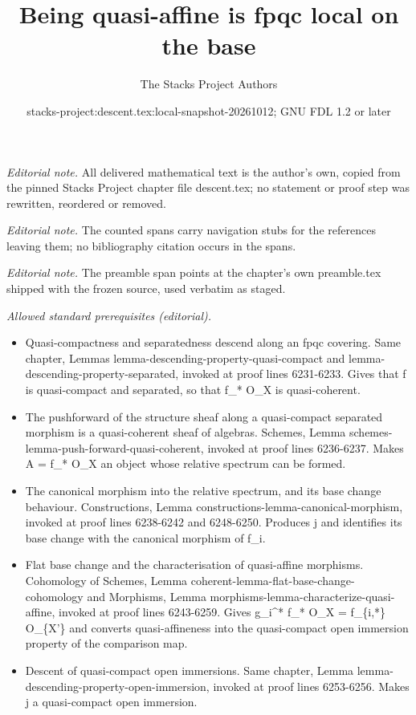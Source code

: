 \documentclass{stacks-project}
\title{Being quasi-affine is fpqc local on the base}
\author{The Stacks Project Authors}
\date{stacks-project:descent.tex:local-snapshot-20261012; GNU FDL 1.2 or later}
\theoremstyle{plain}
\theoremstyle{definition}
\theoremstyle{remark}
\numberwithin{equation}{subsection}
\begin{document}
\maketitle
\noindent\textit{Editorial note.} All delivered mathematical text is the author's own, copied from the pinned Stacks Project chapter file descent.tex; no statement or proof step was rewritten, reordered or removed.\par\medskip
\noindent\textit{Editorial note.} The counted spans carry navigation stubs for the references leaving them; no bibliography citation occurs in the spans.\par\medskip
\noindent\textit{Editorial note.} The preamble span points at the chapter's own preamble.tex shipped with the frozen source, used verbatim as staged.\par\medskip
\noindent\textit{Allowed standard prerequisites (editorial).}\begin{itemize}
\item Quasi-compactness and separatedness descend along an fpqc covering. Same chapter, Lemmas lemma-descending-property-quasi-compact and lemma-descending-property-separated, invoked at proof lines 6231-6233. Gives that f is quasi-compact and separated, so that f\_* O\_X is quasi-coherent.
\item The pushforward of the structure sheaf along a quasi-compact separated morphism is a quasi-coherent sheaf of algebras. Schemes, Lemma schemes-lemma-push-forward-quasi-coherent, invoked at proof lines 6236-6237. Makes A = f\_* O\_X an object whose relative spectrum can be formed.
\item The canonical morphism into the relative spectrum, and its base change behaviour. Constructions, Lemma constructions-lemma-canonical-morphism, invoked at proof lines 6238-6242 and 6248-6250. Produces j and identifies its base change with the canonical morphism of f\_i.
\item Flat base change and the characterisation of quasi-affine morphisms. Cohomology of Schemes, Lemma coherent-lemma-flat-base-change-cohomology and Morphisms, Lemma morphisms-lemma-characterize-quasi-affine, invoked at proof lines 6243-6259. Gives g\_i\textasciicircum{}* f\_* O\_X = f\_\{i,*\} O\_\{X'\} and converts quasi-affineness into the quasi-compact open immersion property of the comparison map.
\item Descent of quasi-compact open immersions. Same chapter, Lemma lemma-descending-property-open-immersion, invoked at proof lines 6253-6256. Makes j a quasi-compact open immersion.
\end{itemize}\medskip
\end{document}

